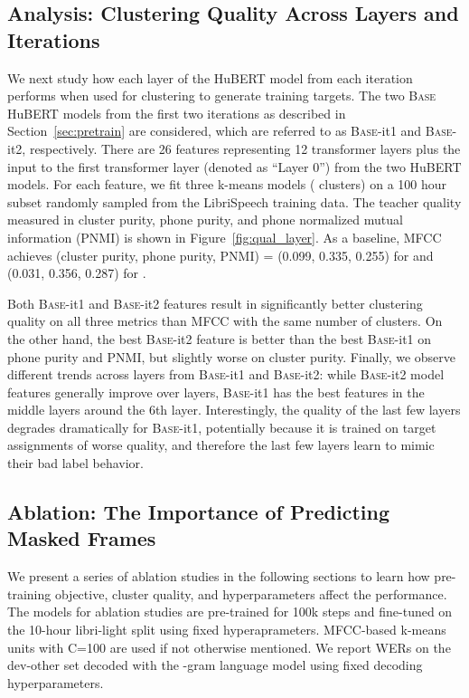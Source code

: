\subsection{Analysis: Clustering Quality Across Layers and Iterations}
We next study how each layer of the HuBERT model from each iteration performs when used for clustering to generate training targets.
The two \textsc{Base} HuBERT models from the first two iterations as described in Section~\ref{sec:pretrain} are considered, which are referred to as \textsc{Base}-it1 and \textsc{Base}-it2, respectively. There are 26 features representing 12 transformer layers plus the input to the first transformer layer (denoted as ``Layer 0'') from the two HuBERT models.
For each feature, we fit three k-means models ( clusters) on a 100 hour subset randomly sampled from the LibriSpeech training data. The teacher quality measured in cluster purity, phone purity, and phone normalized mutual information (PNMI) is shown in Figure~\ref{fig:qual_layer}.
As a baseline, MFCC achieves (cluster purity, phone purity, PNMI) = (0.099, 0.335, 0.255) for  and (0.031, 0.356, 0.287) for .

Both \textsc{Base}-it1 and \textsc{Base}-it2 features result in significantly better clustering quality on all three metrics than MFCC with the same number of clusters. On the other hand, the best \textsc{Base}-it2 feature is better than the best \textsc{Base}-it1 on phone purity and PNMI, but slightly worse on cluster purity.
Finally, we observe different trends across layers from \textsc{Base}-it1 and \textsc{Base}-it2: while \textsc{Base}-it2 model features generally improve over layers, \textsc{Base}-it1 has the best features in the middle layers around the 6th layer. Interestingly, the quality of the last few layers degrades dramatically for \textsc{Base}-it1, potentially because it is trained on target assignments of worse quality, and therefore the last few layers learn to mimic their bad label behavior.

\subsection{Ablation: The Importance of Predicting Masked Frames}
We present a series of ablation studies in the following sections to learn how pre-training objective, cluster quality, and hyperparameters affect the performance. 
The models for ablation studies are pre-trained for 100k steps and fine-tuned on the 10-hour libri-light split using fixed hyperaprameters. MFCC-based k-means units with C=100 are used if not otherwise mentioned. We report WERs on the dev-other set decoded with the -gram language model using fixed decoding hyperparameters.

